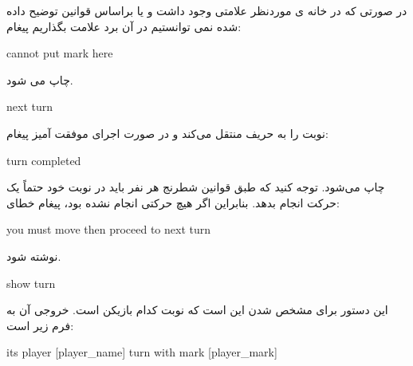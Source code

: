 \documentclass[]{article}
\begin{document}
در صورتی که در خانه ی موردنظر علامتی وجود داشت و یا براساس قوانین توضیح داده شده نمی توانستیم در آن برد علامت بگذاریم  پیغام:

\begin{tcolorbox}[boxrule=0pt]
	\begin{latin}
  	  \large{
  	  	cannot put mark here
		}
	\end{latin}
\end{tcolorbox}
چاپ می شود.

\hrulefill

\begin{tcolorbox}[boxrule=0pt]
	\begin{latin}
  	  \large{
  	  	next turn
		}
	\end{latin}
\end{tcolorbox}

نوبت را به حریف منتقل می‌کند و در صورت اجرای موفقت آمیز پیغام:



\begin{tcolorbox}[boxrule=0pt]
	\begin{latin}
  	  \large{
  	  	turn completed
		}
	\end{latin}
\end{tcolorbox}

چاپ می‌شود. توجه کنید که طبق قوانین شطرنج هر نفر باید در نوبت خود حتماً یک حرکت انجام بدهد. بنابراین اگر هیچ حرکتی انجام نشده بود، پیغام خطای:



\begin{tcolorbox}[boxrule=0pt]
	\begin{latin}
  	  \large{
  	  	you must move then proceed to next turn
		}
	\end{latin}
\end{tcolorbox}

نوشته شود.

\hrulefill


\begin{tcolorbox}[boxrule=0pt]
	\begin{latin}
  	  \large{
  	  	show turn
		}
	\end{latin}
\end{tcolorbox}

این دستور برای مشخص شدن این است که نوبت کدام بازیکن است. خروجی آن به فرم زیر است:



\begin{tcolorbox}[boxrule=0pt]
	\begin{latin}
  	  \large{
  	  	its player [player\_name] turn with mark [player\_mark]
		}
	\end{latin}
\end{tcolorbox}
\end{document}
